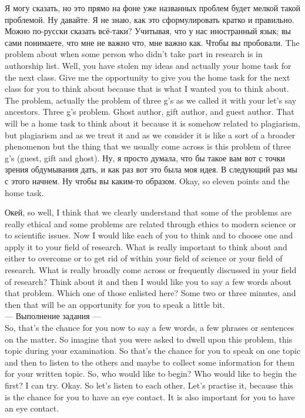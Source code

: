 \documentclass[main.tex]{subfiles}
\begin{document}
Я могу сказать, но это прямо на фоне уже названных проблем будет мелкой такой проблемой.
Ну давайте.
Я не знаю, как это сформулировать кратко и правильно.
Можно по-русски сказать всё-таки?
Учитывая, что у нас иностранный язык; вы сами понимаете, что мне не важно что, мне важно как.
Чтобы вы пробовали.
The problem about when some person who didn't take part in research is in authorship list.
Well, you have stolen my ideas and actually your home task for the next class.
Give me the opportunity to give you the home task for the next class for you to think about because that is what I wanted you to think about.
The problem, actually the problem of three g's as we called it with your let's say ancestors.
Three g's problem.
Ghost author, gift author, and guest author.
That will be a home task to think about it because it is somehow related to plagiarism, but plagiarism and as we treat it and as we consider it is like a sort of a broader phenomenon but the thing that we usually come across is this problem of three g's (guest, gift and ghost).
Ну, я просто думала, что бы такое вам вот с точки зрения обдумывания дать, и как раз вот это была моя идея.
В следующий раз мы с этого начнем.
Ну чтобы вы каким-то образом.
Okay, so eleven points and the home task.

Окей, so well, I think that we clearly understand that some of the problems are really ethical and some problems are related through ethics to modern science or to scientific issues.
Now I would like each of you to think and to choose one and apply it to your field of research.
What is really important to think about and either to overcome or to get rid of within your field of science or your field of research.
What is really broadly come across or frequently discussed in your field of research?
Think about it and then I would like you to say a few words about that problem.
Which one of those enlisted here?
Some two or three minutes, and then that will be an opportunity for you to speak a little bit.
\\

--- Выполнение задания ---
\\

So, that's the chance for you now to say a few words, a few phrases or sentences on the matter.
So imagine that you were asked to dwell upon this problem, this topic during your examination.
So that's the chance for you to speak on one topic and then to listen to the others and maybe to collect some information for them for your written topic.
So, who would like to begin?
Who would like to begin the first?
I can try.
Okay.
So let's listen to each other.
Let's practise it, because this is the chance for you to have an eye contact.
It is also important for you to have an eye contact.
\end{document}
